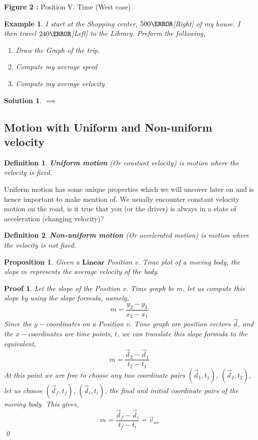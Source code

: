 \documentclass[12pt]{article}
\theoremstyle{break}
\newtheorem{ex}[thm]{Example}
\newtheorem*{pf}{Proof}
\newtheorem*{soln}{Solution}
\newtheorem{defn}{Definition}[subsection]
\newtheorem{prop}[thm]{Proposition}
\begin{document}
\begin{center}
\textbf{Figure 2 :} Position V. Time (West case)
\end{center}

\begin{ex}
I start at the Shopping center, $500\m$[Right] of my house. I then travel $240\m$[Left] to the Library. Preform the following,
\begin{enumerate}[label=(\alph*)]
	\item Draw the Graph of the trip.
	\item Compute my average speed
	\item Compute my average velocity
\end{enumerate}
\end{ex}
\begin{soln}
	$\implies$
	\vspace*{5cm}
\end{soln}
\newpage

\newpage
\vspace*{8cm}

\subsection{Motion with Uniform and Non-uniform velocity}
\begin{defn}
	\textbf{Uniform motion} (Or constant velocity) is motion where the velocity is fixed.
\end{defn}
Uniform motion has some unique properties which we will uncover later on and is hence important to make mention of. We usually encounter constant velocity motion on the road, is it true that you (or the driver) is always in a state of acceleration (changing velocity)?
\begin{defn}
	\textbf{Non-uniform motion} (Or accelerated motion) is motion where the velocity is \emph{not} fixed.
\end{defn}

\begin{prop}
Given a $\textbf{Linear}$ Position v. Time plot of a moving body, the slope $m$ represents the average velocity of the body.
\end{prop}
\begin{pf}
Let the slope of the Position v. Time graph be $m$, let us compute this slope by using the slope formula, namely,
$$m = \frac{y_2 - y_1}{x_2 - x_1}$$
Since the $y-$coordinates on a Position v. Time graph are position vectors $\vec d$, and the $x-$coordinates are time points, $t$, we can translate this slope formula to the equivalent,
$$m = \frac{\vec d_2 - \vec d_1}{t_2 - t_1}$$
At this point we are free to choose any two coordinate pairs $(\vec d_1,t_1)$, $(\vec d_2, t_2)$, let us choose $(\vec d_f, t_f)$, $(\vec d_i, t_i)$, the final and initial coordinate pairs of the moving body. This gives,
$$m = \frac{\vec d_f - \vec d_i}{t_f - t_i} = \vec v_{av}$$
 \qed
\end{pf}
\end{document}
